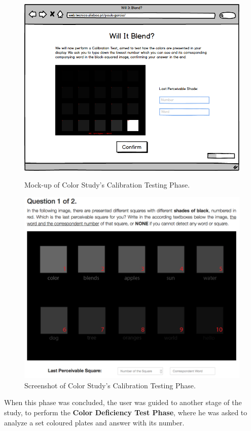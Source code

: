 \begin{figure}[htbp]
  \centering
  \begin{minipage}{0.49\textwidth}
		\centering
	  \includegraphics[width=\textwidth]{images/implementation/mockup_calibration.png}
	  \caption[Mock-up of Color Study's Calibration Testing Phase.]{Mock-up of Color Study's Calibration Testing Phase.}
	  \label{fig:mockup_calibration}
  \end{minipage} \hfill
	\begin{minipage}{0.49\textwidth}
		\centering
		\includegraphics[width=\textwidth]{images/implementation/screen_calibration.png}
		\caption[Screenshot of Color Study's Calibration Testing Phase.]{Screenshot of Color Study's Calibration Testing Phase.}
		\label{fig:screen_calibration}
	\end{minipage}
\end{figure}
%
When this phase was concluded, the user was guided to another stage of the study, to perform the \textbf{Color Deficiency Test Phase}, where
he was asked to analyze a set coloured plates and answer with its number. \par
%
%
